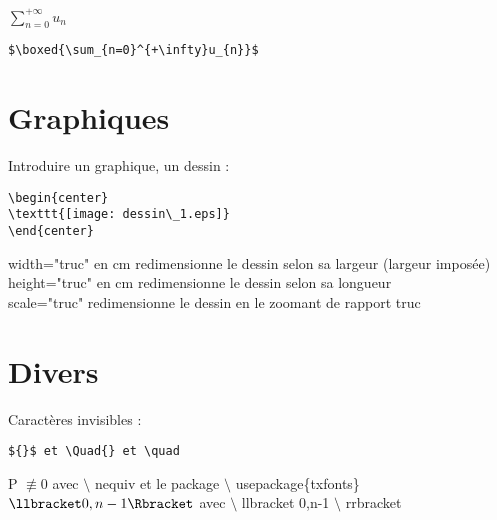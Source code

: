 \documentclass[12pt,french,oneside]{report}
\begin{document}
\begin{spacing}{1.2}
\begin{center}
$\boxed{\sum_{n=0}^{+\infty}u_{n}}$
\end{center}

\begin{verbatim}
$\boxed{\sum_{n=0}^{+\infty}u_{n}}$
\end{verbatim}

\section{Graphiques}

Introduire un graphique, un dessin : 

\begin{verbatim}
\begin{center}
\texttt{[image: dessin\_1.eps]}
\end{center}
\end{verbatim}

width="truc" en cm redimensionne le dessin selon sa largeur (largeur imposée)\\
height="truc" en cm redimensionne le dessin selon sa longueur\\
scale="truc" redimensionne le dessin en le zoomant de rapport truc\\
\section{Divers}

Caractères invisibles : \begin{verbatim}${}$ et \Quad{} et \quad \end{verbatim}

P $\nequiv 0$ avec $\setminus$ nequiv et le package  $\setminus$ usepackage\{txfonts\}\\

$\llbracket 0,n-1 \Rbracket$ avec $\setminus$ llbracket 0,n-1 $\setminus$ rrbracket \\


\end{spacing}
\end{document}
